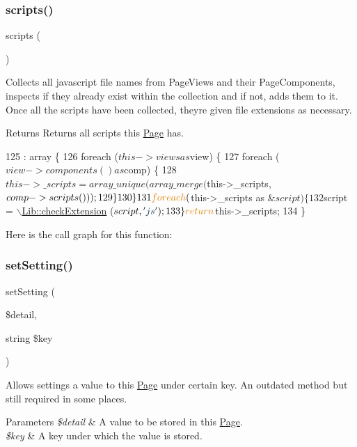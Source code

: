\subsubsection{\texorpdfstring{scripts()}{scripts()}}
{\footnotesize\ttfamily scripts (\begin{DoxyParamCaption}{ }\end{DoxyParamCaption})}

Collects all javascript file names from Page\+Views and their Page\+Components, inspects if they already exist within the collection and if not, adds them to it. Once all the scripts have been collected, they\textquotesingle{}re given file extensions as necessary. \begin{DoxyReturn}{Returns}
Returns all scripts this \hyperlink{class_lora_1_1_page}{Page} has. 
\end{DoxyReturn}

\begin{DoxyCode}
125                                : array \{
126         \textcolor{keywordflow}{foreach} ($this->views as $view) \{
127             \textcolor{keywordflow}{foreach} ($view->components () as $comp) \{
128                 $this->\_scripts = array\_unique (array\_merge ($this->\_scripts, $comp->scripts ()));
129             \}
130         \}
131         \textcolor{keywordflow}{foreach} ($this->\_scripts as &$script) \{
132             $script = \hyperlink{class_lib_ab5fbdf394f09fcef4dcea271c344cb65}{\(\backslash\)Lib::checkExtension} ($script, \textcolor{stringliteral}{'js'});
133         \} \textcolor{keywordflow}{return} $this->\_scripts;
134     \}
\end{DoxyCode}
Here is the call graph for this function\+:
\mbox{\label{class_lora_1_1_page_a1d32f1ec82bc539460db5c0666b18a76}} 
\subsubsection{\texorpdfstring{set\+Setting()}{setSetting()}}
{\footnotesize\ttfamily set\+Setting (\begin{DoxyParamCaption}\item[{}]{\$detail,  }\item[{string}]{\$key }\end{DoxyParamCaption})}

Allows settings a value to this \hyperlink{class_lora_1_1_page}{Page} under certain key. An outdated method but still required in some places. 
\begin{DoxyParams}{Parameters}
{\em \$detail} & A value to be stored in this \hyperlink{class_lora_1_1_page}{Page}. \\
\hline
{\em \$key} & A key under which the value is stored. \\
\hline
\end{DoxyParams}

